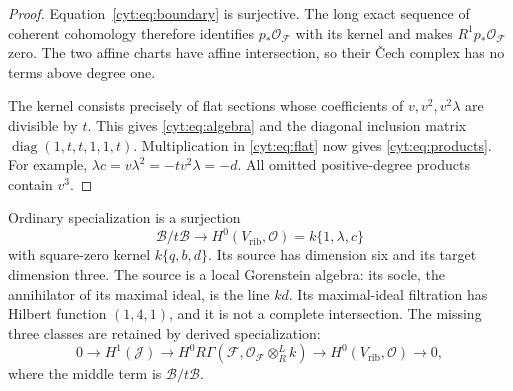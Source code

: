 \begin{proof}
Equation~\eqref{cyt:eq:boundary} is surjective.
The long exact sequence of coherent cohomology therefore
identifies \(p_*\mathcal O_{\mathscr F}\) with its kernel
and makes \(R^1p_*\mathcal O_{\mathscr F}\) zero.
The two affine charts have affine intersection, so their
\v Cech complex has no terms above degree one.

The kernel consists precisely of flat sections whose
coefficients of \(v,v^2,v^2\lambda\) are divisible by \(t\).
This gives \eqref{cyt:eq:algebra} and the diagonal inclusion
matrix \(\operatorname{diag}(1,t,t,1,1,t)\).
Multiplication in \eqref{cyt:eq:flat} now gives
\eqref{cyt:eq:products}. For example,
\(\lambda c=v\lambda^2=-tv^2\lambda=-d\).
All omitted positive-degree products contain \(v^3\).
\end{proof}

\begin{proposition}\label{cyt:prop:specialization}
Ordinary specialization is a surjection
\[
 \mathcal B/t\mathcal B\longrightarrow
 H^0(V_{\mathrm{rib}},\mathcal O)
     =k\{1,\lambda,c\}
\]
with square-zero kernel \(k\{q,b,d\}\).
Its source has dimension six and its target dimension three.
The source is a local Gorenstein algebra: its socle, the
annihilator of its maximal ideal, is the line \(kd\).
Its maximal-ideal filtration has Hilbert function \((1,4,1)\),
and it is not a complete intersection.
The missing three classes are retained by derived specialization:
\begin{equation}\label{cyt:eq:derived-fiber}
 0\longrightarrow H^1(\mathcal J)\longrightarrow
 H^0R\Gamma(\mathscr F,
       \mathcal O_{\mathscr F}\otimes_R^L k)
 \longrightarrow H^0(V_{\mathrm{rib}},\mathcal O)
 \longrightarrow0,
\end{equation}
where the middle term is \(\mathcal B/t\mathcal B\).
\end{proposition}

